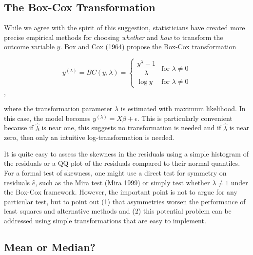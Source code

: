 \documentclass[12pt]{article}
\begin{document}
\subsection*{The Box-Cox Transformation}

While we agree with the spirit of this suggestion, statisticians have created more precise empirical methods for choosing \textit{whether} and \textit{how} to transform the outcome variable $y$. Box and Cox (1964) propose the Box-Cox transformation 

\begin{displaymath}
   y^{(\lambda)} = BC(y, \lambda) = \left\{
     \begin{array}{lr}
       \dfrac{y^\lambda - 1}{\lambda} & \text{for } \lambda \neq 0\\
       \log y & \text{for } \lambda \neq 0
     \end{array}
   \right.
\end{displaymath},

\noindent where the transformation parameter $\lambda$ is estimated with maximum likelihood. In this case, the model becomes $y^{(\lambda)} = X\beta + \epsilon$. This is particularly convenient because if $\hat{\lambda}$ is near one, this suggests no transformation is needed and if $\hat{\lambda}$ is near zero, then only an intuitive log-transformation is needed.

It is quite easy to assess the skewness in the residuals using a simple histogram of the residuals or a QQ plot of the residuals compared to their normal quantiles. For a formal test of skewness, one might use a direct test for symmetry on residuals $\hat{e}$, such as the Mira test (Mira 1999) or simply test whether $\lambda \neq 1$ under the Box-Cox framework. However, the important point is not to argue for any particular test, but to point out (1) that asymmetries worsen the performance of least squares and alternative methods and (2) this potential problem can be addressed using simple transformations that are easy to implement.

\subsection*{Mean or Median?}
\end{document}
